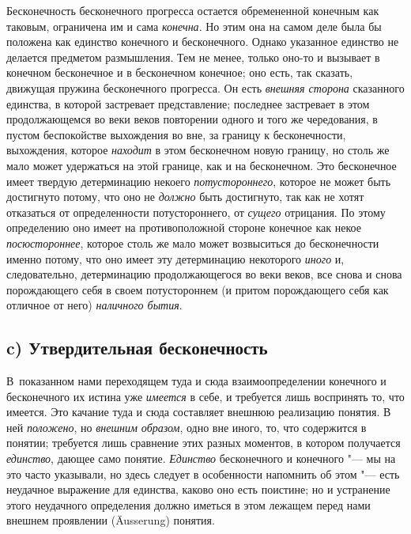 Бесконечность бесконечного прогресса остается обремененной конечным как
таковым, ограничена им и сама {\em конечна}. Но этим
она на самом деле была бы положена как единство конечного и бесконечного.
Однако указанное единство не делается предметом размышления. Тем не менее,
только оно-то и вызывает в конечном бесконечное и в бесконечном конечное;
оно есть, так сказать, движущая пружина бесконечного прогресса. Он есть
{\em внешняя сторона} сказанного единства, в которой
застревает представление; последнее застревает в этом продолжающемся во
веки веков повторении одного и того же чередования, в пустом беспокойстве
выхождения во вне, за границу к бесконечности, выхождения, которое
{\em находит} в этом бесконечном новую границу, но
столь же мало может удержаться на этой границе, как и на бесконечном. Это
бесконечное имеет твердую детерминацию некоего
{\em потустороннего}, которое не может быть достигнуто
потому, что оно не {\em должно} быть достигнуто, так
как не хотят отказаться от определенности потустороннего, от
{\em сущего} отрицания. По этому определению оно имеет
на противоположной стороне конечное как некое
{\em посюстороннее}, которое столь же мало может
возвыситься до бесконечности именно потому, что оно имеет эту детерминацию
некоторого {\em иного} и, следовательно, детерминацию
продолжающегося во веки веков, все снова и снова порождающего себя в своем
потустороннем (и притом порождающего себя как отличное от него)
{\em наличного бытия}.

\subsection[c) Утвердительная бесконечность]{c) Утвердительная бесконечность}

В~показанном нами переходящем туда и сюда взаимоопределении конечного и
бесконечного их истина уже {\em имеется} в себе, и
требуется лишь воспринять то, что имеется. Это качание туда и сюда
составляет внешнюю реализацию понятия. В ней
{\em положено}, но {\em внешним
образом}, одно вне иного, то, что содержится в понятии; требуется лишь
сравнение этих разных моментов, в котором получается
{\em единство}, дающее само понятие.
{\em Единство} бесконечного и конечного "--- мы на это
часто указывали, но здесь следует в особенности напомнить об этом "--- есть
неудачное выражение для единства, каково оно есть поистине; но и устранение
этого неудачного определения должно иметься в этом лежащем перед нами
внешнем проявлении (Äusserung) понятия.

